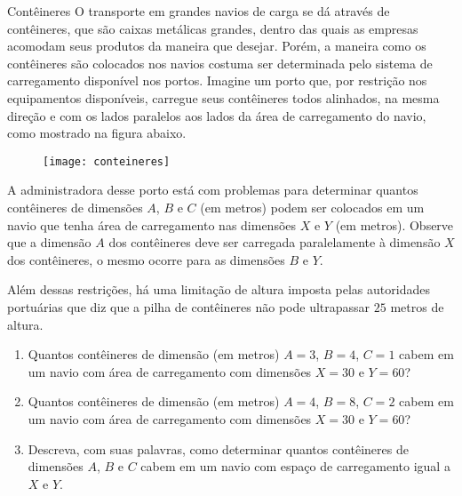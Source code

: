 \begin{task}{Contêineres}
\label{comp-task4}
O transporte em grandes navios de carga se dá através de contêineres, que são caixas metálicas grandes, dentro das quais as empresas acomodam seus produtos da maneira que desejar. Porém, a maneira como os contêineres são colocados nos navios costuma ser determinada pelo sistema de carregamento disponível nos portos. Imagine um porto que, por restrição nos equipamentos disponíveis, carregue seus contêineres todos alinhados, na mesma direção e com os lados paralelos aos lados da área de carregamento do navio, como mostrado na figura abaixo.

\begin{figure}[H]
\centering

\texttt{[image: conteineres]}
\end{figure}

A administradora desse porto está com problemas para determinar quantos contêineres de dimensões $A$, $B$ e $C$ (em metros) podem ser colocados em um navio que tenha área de carregamento nas dimensões $X$ e $Y$ (em metros). Observe que a dimensão $A$ dos contêineres deve ser carregada paralelamente à dimensão $X$ dos contêineres, o mesmo ocorre para as dimensões $B$ e $Y$.

Além dessas restrições, há uma limitação de altura imposta pelas autoridades portuárias que diz que a pilha de contêineres não pode ultrapassar $25$ metros de altura.

\begin{enumerate}
\item Quantos contêineres de dimensão (em metros) $A=3$, $B=4$, $C=1$ cabem em um navio com área de carregamento com dimensões $X=30$ e $Y=60$?

\item Quantos contêineres de dimensão (em metros) $A=4$, $B=8$, $C=2$ cabem em um navio com área de carregamento com dimensões $X=30$ e $Y=60$?

\item Descreva, com suas palavras, como determinar quantos contêineres de dimensões $A$, $B$ e $C$ cabem em um navio com espaço de carregamento igual a $X$ e $Y$.
\end{enumerate}
\end{task}

